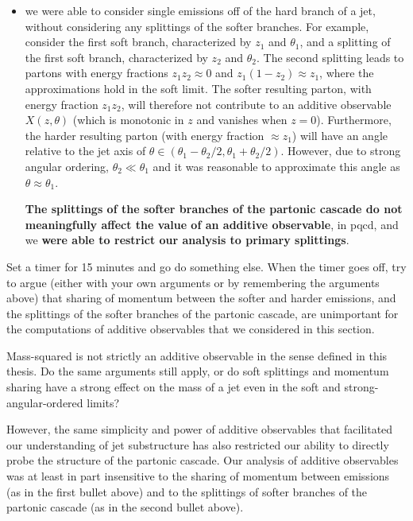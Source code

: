 \begin{itemize}
     \item
         we were able to consider single emissions off of the hard branch of a jet, without considering any splittings of the softer branches.
         For example, consider the first soft branch, characterized by \(z_1\) and \(\theta_1\), and a splitting of the first soft branch, characterized by \(z_2\) and \(\theta_2\).
         The second splitting leads to partons with energy fractions \(z_1 z_2 \approx 0\) and \(z_1 (1-z_2) \approx z_1\), where the approximations hold in the soft limit.
         The softer resulting parton, with energy fraction \(z_1 z_2\), will therefore not contribute to an additive observable \(X(z,\theta)\) (which is monotonic in \(z\) and vanishes when \(z = 0\)).
         Furthermore, the harder resulting parton (with energy fraction \(\approx z_1\)) will have an angle relative to the jet axis of \(\theta \in (\theta_1 - \theta_2/2, \theta_1 + \theta_2/2)\).
         However, due to strong angular ordering, \(\theta_2 \ll \theta_1\) and it was reasonable to approximate this angle as \(\theta \approx \theta_1\).

         \textbf{The splittings of the softer branches of the partonic cascade do not meaningfully affect the value of an additive observable}, in \gls{pqcd}, and we \textbf{were able to restrict our analysis to primary splittings}.
\end{itemize}

\begin{exercise}
    Set a timer for 15 minutes and go do something else.
    When the timer goes off, try to argue (either with your own arguments or by remembering the arguments above) that sharing of momentum between the softer and harder emissions, and the splittings of the softer branches of the partonic cascade, are unimportant for the computations of additive observables that we considered in this section.

    Mass-squared is not strictly an additive observable in the sense defined in this thesis.
    Do the same arguments still apply, or do soft splittings and momentum sharing have a strong effect on the mass of a jet even in the soft and strong-angular-ordered limits?
\end{exercise}


However, the same simplicity and power of additive observables that facilitated our understanding of jet substructure has also restricted our ability to directly probe the structure of the partonic cascade.
%
Our analysis of additive observables was at least in part insensitive to the sharing of momentum between emissions (as in the first bullet above) and to the splittings of softer branches of the partonic cascade (as in the second bullet above).


